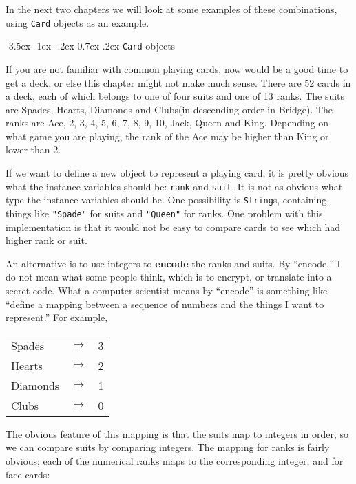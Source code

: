 \documentclass{book}
\makeatletter
\renewcommand{\section}{\@startsection 
    {section} {1} {0mm}%
    {-3.5ex \@plus -1ex \@minus -.2ex}%
    {0.7ex \@plus.2ex}%
    {\normalfont\Large\bfseries}}
\makeatother
\begin{document}
In the next two chapters we will look at some examples of these
combinations, using {\tt Card} objects as an example.


\section{{\tt Card} objects}
\label{card}

If you are not familiar with common playing cards, now would be a good
time to get a deck, or else this chapter might not make much sense.
There are 52 cards in a deck, each of which belongs to one of four
suits and one of 13 ranks.  The suits are Spades, Hearts, Diamonds and
Clubs(in descending order in Bridge).  The ranks are Ace, 2, 3, 4, 5,
6, 7, 8, 9, 10, Jack, Queen and King.  Depending on what game you are
playing, the rank of the Ace may be higher than King or lower than 2.


If we want to define a new object to represent a playing card, it is
pretty obvious what the instance variables should be: {\tt rank} and
{\tt suit}.  It is not as obvious what type the instance variables
should be.  One possibility is {\tt String}s, containing things like
{\tt "Spade"} for suits and {\tt "Queen"} for ranks.  One problem with
this implementation is that it would not be easy to compare cards to
see which had higher rank or suit.


An alternative is to use integers to {\bf encode} the ranks and
suits.  By ``encode,'' I do not mean what some people think, which
is to encrypt, or translate into a secret code.  What a computer
scientist means by ``encode'' is something like ``define a mapping
between a sequence of numbers and the things I want to represent.''
For example,

\begin{tabular}{l c l}
Spades & $\mapsto$ & 3 \\
Hearts & $\mapsto$ & 2 \\
Diamonds & $\mapsto$ & 1 \\
Clubs & $\mapsto$ & 0
\end{tabular}

The obvious feature of this mapping is that the suits map to
integers in order, so we can compare suits by comparing integers.
The mapping for ranks is fairly obvious; each of the numerical
ranks maps to the corresponding integer, and for face cards:
\end{document}
